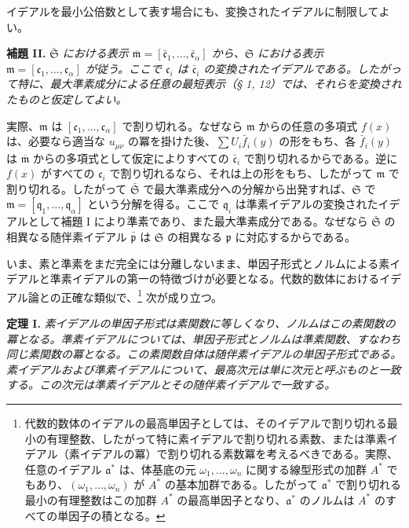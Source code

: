 \documentclass[11pt]{article}
\providecommand{\frakS}{\mathfrak S}
\providecommand{\frakm}{\mathfrak m}
\providecommand{\frakp}{\mathfrak p}
\providecommand{\frakq}{\mathfrak q}
\providecommand{\fraka}{\mathfrak a}
\providecommand{\frakc}{\mathfrak c}
\providecommand{\barfrakm}{\overline{\mathfrak m}}
\providecommand{\frakp}{\mathfrak p}
\providecommand{\frakq}{\mathfrak q}
\begin{document}
イデアルを最小公倍数として表す場合にも、変換されたイデアルに制限してよい。

\textbf{補題 II.} \emph{$\bar{\frakS}$ における表示 $\barfrakm=[\bar{\frakc}_1,\ldots,\bar{\frakc}_\alpha]$ から、$\frakS$ における表示 $\frakm=[\frakc_1,\ldots,\frakc_\alpha]$ が従う。ここで $\frakc_i$ は $\bar{\frakc}_i$ の変換されたイデアルである。したがって特に、最大準素成分による任意の最短表示（§ 1, 12）では、それらを変換されたものと仮定してよい。}

実際、$\frakm$ は $[\frakc_1,\ldots,\frakc_\alpha]$ で割り切れる。なぜなら $\frakm$ からの任意の多項式 $f(x)$ は、必要なら適当な $u_{\mu\nu}$ の冪を掛けた後、$\sum U_i\bar f_i(y)$ の形をもち、各 $\bar f_i(y)$ は $\barfrakm$ からの多項式として仮定によりすべての $\bar{\frakc}_i$ で割り切れるからである。逆に $f(x)$ がすべての $\frakc_i$ で割り切れるなら、それは上の形をもち、したがって $\frakm$ で割り切れる。したがって $\bar{\frakS}$ で最大準素成分への分解から出発すれば、$\frakS$ で $\frakm=[\frakq_1,\ldots,\frakq_\alpha]$ という分解を得る。ここで $\frakq_i$ は準素イデアルの変換されたイデアルとして補題 I により準素であり、また最大準素成分である。なぜなら $\bar{\frakS}$ の相異なる随伴素イデアル $\bar{\frakp}$ は $\frakS$ の相異なる $\frakp$ に対応するからである。

いま、素と準素をまだ完全には分離しないまま、単因子形式とノルムによる素イデアルと準素イデアルの第一の特徴づけが必要となる。代数的数体におけるイデアル論との正確な類似で、\footnote{代数的数体のイデアルの最高単因子としては、そのイデアルで割り切れる最小の有理整数、したがって特に素イデアルで割り切れる素数、または準素イデアル（素イデアルの冪）で割り切れる素数冪を考えるべきである。実際、任意のイデアル $\fraka^*$ は、体基底の元 $\omega_1,\ldots,\omega_n$ に関する線型形式の加群 $A^*$ でもあり、$(\omega_1,\ldots,\omega_n)$ が $A^*$ の基本加群である。したがって $\fraka^*$ で割り切れる最小の有理整数はこの加群 $A^*$ の最高単因子となり、$\fraka^*$ のノルムは $A^*$ のすべての単因子の積となる。} 次が成り立つ。

\textbf{定理 I.} \emph{素イデアルの単因子形式は素関数に等しくなり、ノルムはこの素関数の冪となる。準素イデアルについては、単因子形式とノルムは準素関数、すなわち同じ素関数の冪となる。この素関数自体は\mbox{随伴素イデアル}の単因子形式である。素イデアルおよび準素イデアルについて、最高次元は単に次元と呼ぶものと一致する。この次元は準素イデアルとその随伴素イデアルで一致する。}
\end{document}
